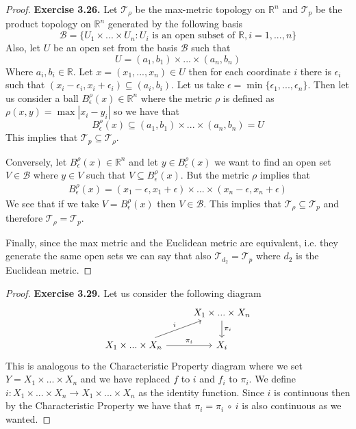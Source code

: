 \documentclass[11pt]{article}
\newcommand{\R}{\mathbb{R}}
\newcommand{\Topo}{\mathcal{T}}
\theoremstyle{definition}
\begin{document}
\begin{proof}{\textbf{Exercise 3.26.}}
    Let $\Topo_\rho$ be the max-metric topology on $\R^n$ and
    $\Topo_p$ be the product topology on $\R^n$ generated by the following
    basis
    $$\mathcal{B} =
    \{U_1 \times ... \times U_n: U_i \text{ is an open subset of }
    \R, i = 1,..., n\}$$
    Also, let $U$ be an open set from the basis $\mathcal{B}$ such that 
    $$U = (a_1, b_1) \times ... \times (a_n, b_n)$$
    Where $a_i, b_i \in \R$. Let $x = (x_1, ..., x_n) \in U$ then
    for each coordinate $i$ there is $\epsilon_i$ such that
    $(x_i - \epsilon_i, x_i + \epsilon_i) \subseteq (a_i, b_i)$. Let us take
    $\epsilon = \min\{\epsilon_1, ..., \epsilon_n\}$. Then let us consider
    a ball $B_{\epsilon}^{\rho}(x) \in \R^n$ where the metric $\rho$ is defined
    as  $\rho(x,y) = \max |x_i - y_i|$ so we have that 
    $$B_{\epsilon}^{\rho}(x) \subseteq (a_1, b_1) \times ... \times (a_n, b_n) = U$$
    This implies that $\Topo_p \subseteq \Topo_\rho$.

    Conversely, let $B_{\epsilon}^\rho(x) \in \R^n$ and let
    $y \in B_{\epsilon}^\rho(x)$ we want to find an open set $V \in \mathcal{B}$
    where $y \in V$ such that $V \subseteq B_{\epsilon}^\rho(x)$.
    But the metric $\rho$ implies that
    \begin{align*}
        B_{\epsilon}^\rho(x) = (x_1 - \epsilon, x_1 + \epsilon)
        \times ... \times (x_n - \epsilon, x_n + \epsilon)
    \end{align*}
    We see that if we take $V = B_{\epsilon}^\rho(x)$ then $V \in \mathcal{B}$.
    This implies that $\Topo_\rho \subseteq \Topo_p$ and therefore
    $\Topo_\rho = \Topo_p$.

    Finally, since the max metric and the Euclidean metric are equivalent, i.e.
    they generate the same open sets we can say that also $\Topo_{d_2} = \Topo_p$
    where $d_2$ is the Euclidean metric.
\end{proof}
\begin{proof}{\textbf{Exercise 3.29.}}
    Let us consider the following diagram
    \[\begin{tikzcd}
        & X_1 \times ... \times X_n \arrow[d,"\pi_i"] \\
        X_1 \times ... \times X_n \arrow[ur,"i"]\arrow[r,"\pi_i"] & X_i
    \end{tikzcd}\]
    This is analogous to the Characteristic Property diagram where we set
    $Y = X_1 \times ... \times X_n$ and we have
    replaced $f$ to $i$ and $f_i$ to $\pi_i$. We define 
    $i:X_1 \times ... \times X_n \to X_1 \times ... \times X_n$
    as the identity function.
    Since $i$ is continuous then by the Characteristic Property
    we have that $\pi_i = \pi_i~\circ~i$ is also continuous as we wanted.
\end{proof}
\end{document}

